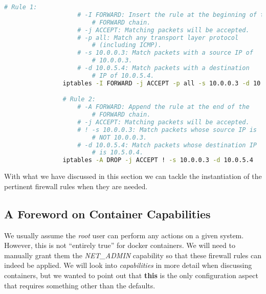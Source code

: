             \begin{lstlisting}[language = bash, caption = Instantiating \textit{iptables} Rules., label = lst:iptables-rules]
                # Rule 1:
                    # -I FORWARD: Insert the rule at the beginning of the
                        # FORWARD chain.
                    # -j ACCEPT: Matching packets will be accepted.
                    # -p all: Match any transport layer protocol
                        # (including ICMP).
                    # -s 10.0.0.3: Match packets with a source IP of
                        # 10.0.0.3.
                    # -d 10.0.5.4: Match packets with a destination
                        # IP of 10.0.5.4.
                iptables -I FORWARD -j ACCEPT -p all -s 10.0.0.3 -d 10.0.5.4

                # Rule 2:
                    # -A FORWARD: Append the rule at the end of the
                        # FORWARD chain.
                    # -j ACCEPT: Matching packets will be accepted.
                    # ! -s 10.0.0.3: Match packets whose source IP is
                        # NOT 10.0.0.3.
                    # -d 10.0.5.4: Match packets whose destination IP
                        # is 10.5.0.4.
                iptables -A DROP -j ACCEPT ! -s 10.0.0.3 -d 10.0.5.4
            \end{lstlisting}

            With what we have discussed in this section we can tackle the instantiation of the pertinent firewall rules when they are needed.\\

        \subsection{A Foreword on Container Capabilities}
            We usually assume the \textit{root} user can perform any actions on a given system. However, this is not ``entirely true'' for docker containers. We will need to manually grant them the \textit{NET\_ADMIN} capability so that these firewall rules can indeed be applied. We will look into \textit{capabilities} in more detail when discussing containers, but we wanted to point out that \textbf{this} is the only configuration aspect that requires something other than the defaults.\\

